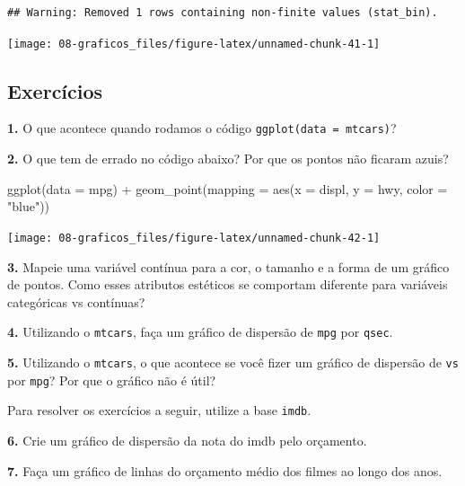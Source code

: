 \documentclass[
]{book}
\newenvironment{Shaded}{\begin{snugshade}}{\end{snugshade}}
\newcommand{\AttributeTok}[1]{\textcolor[rgb]{0.77,0.63,0.00}{#1}}
\newcommand{\FunctionTok}[1]{\textcolor[rgb]{0.00,0.00,0.00}{#1}}
\newcommand{\NormalTok}[1]{#1}
\newcommand{\SpecialCharTok}[1]{\textcolor[rgb]{0.00,0.00,0.00}{#1}}
\newcommand{\StringTok}[1]{\textcolor[rgb]{0.31,0.60,0.02}{#1}}
\begin{document}
\begin{verbatim}
## Warning: Removed 1 rows containing non-finite values (stat_bin).
\end{verbatim}

\begin{center}\texttt{[image: 08-graficos\_files/figure-latex/unnamed-chunk-41-1]} \end{center}

\hypertarget{exercuxedcios-22}{%
\subsection{Exercícios}\label{exercuxedcios-22}}

\textbf{1.} O que acontece quando rodamos o código \texttt{ggplot(data\ =\ mtcars)}?

\textbf{2.} O que tem de errado no código abaixo? Por que os pontos não ficaram azuis?

\begin{Shaded}
\begin{Highlighting}[]
\FunctionTok{ggplot}\NormalTok{(}\AttributeTok{data =}\NormalTok{ mpg) }\SpecialCharTok{+} 
  \FunctionTok{geom\_point}\NormalTok{(}\AttributeTok{mapping =} \FunctionTok{aes}\NormalTok{(}\AttributeTok{x =}\NormalTok{ displ, }\AttributeTok{y =}\NormalTok{ hwy, }\AttributeTok{color =} \StringTok{"blue"}\NormalTok{))}
\end{Highlighting}
\end{Shaded}

\begin{center}\texttt{[image: 08-graficos\_files/figure-latex/unnamed-chunk-42-1]} \end{center}

\textbf{3.} Mapeie uma variável contínua para a cor, o tamanho e a forma de um gráfico de pontos. Como esses atributos estéticos se comportam diferente para variáveis categóricas vs contínuas?

\textbf{4.} Utilizando o \texttt{mtcars}, faça um gráfico de dispersão de \texttt{mpg} por \texttt{qsec}.

\textbf{5.} Utilizando o \texttt{mtcars}, o que acontece se você fizer um gráfico de dispersão de \texttt{vs} por \texttt{mpg}? Por que o gráfico não é útil?

Para resolver os exercícios a seguir, utilize a base \texttt{imdb}.

\textbf{6.} Crie um gráfico de dispersão da nota do imdb pelo orçamento.

\textbf{7.} Faça um gráfico de linhas do orçamento médio dos filmes ao longo dos anos.
\end{document}
